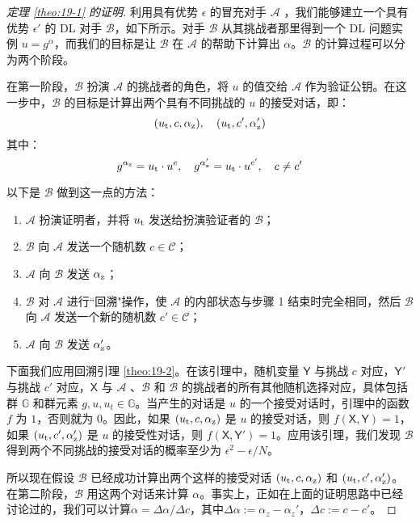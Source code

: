 \begin{proof}[定理 \ref{theo:19-1} 的证明]
	利用具有优势 $\epsilon$ 的冒充对手 $\mathcal{A}$ ，我们能够建立一个具有优势 $\epsilon'$ 的 DL 对手 $\mathcal{B}$，如下所示。对手 $\mathcal{B}$ 从其挑战者那里得到一个 DL 问题实例 $u = g^\alpha$，而我们的目标是让 $\mathcal{B}$ 在 $\mathcal{A}$ 的帮助下计算出 $\alpha$。$\mathcal{B}$ 的计算过程可以分为两个阶段。

在第一阶段，$\mathcal{B}$ 扮演 $\mathcal{A}$ 的挑战者的角色，将 $u$ 的值交给 $\mathcal{A}$ 作为验证公钥。在这一步中，$\mathcal{B}$ 的目标是计算出两个具有不同挑战的 $u$ 的接受对话，即：
\[
(u_{\rm t},c,\alpha_{\rm z}),
\quad
(u_{\rm t},c',\alpha_{\rm z}')
\]
其中：
\[
g^{\alpha_{\rm z}}=u_{\rm t}\cdot u^c,
\quad
g^{\alpha_{\rm z}'}=u_{\rm t}\cdot u^{c'},
\quad
c\neq c'
\]

以下是 $\mathcal{B}$ 做到这一点的方法：
\begin{enumerate}
	\item $\mathcal{A}$ 扮演证明者，并将 $u_{\rm t}$ 发送给扮演验证者的 $\mathcal{B}$；
	\item $\mathcal{B}$ 向 $\mathcal{A}$ 发送一个随机数 $c\in\mathcal{C}$；
	\item $\mathcal{A}$ 向 $\mathcal{B}$ 发送 $\alpha_{\rm z}$；
	\item $\mathcal{B}$ 对 $\mathcal{A}$ 进行``回溯"操作，使 $\mathcal{A}$ 的内部状态与步骤 1 结束时完全相同，然后 $\mathcal{B}$ 向 $\mathcal{A}$ 发送一个新的随机数 $c'\in\mathcal{C}$；
	\item $\mathcal{A}$ 向 $\mathcal{B}$ 发送 $\alpha_{\rm z}'$。
\end{enumerate}
下面我们应用回溯引理 \ref{theo:19-2}。在该引理中，随机变量 $\mathsf{Y}$ 与挑战 $c$ 对应，$\mathsf{Y}'$ 与挑战 $c'$ 对应，$\mathsf{X}$ 与 $\mathcal{A}$ 、$\mathcal{B}$ 和 $\mathcal{B}$ 的挑战者的所有其他随机选择对应，具体包括群 $\mathbb{G}$ 和群元素 $g,u,u_t\in\mathbb{G}$。当产生的对话是 $u$ 的一个接受对话时，引理中的函数 $f$ 为 $1$，否则就为 $0$。因此，如果 $(u_{\rm t},c,\alpha_{\rm z})$ 是 $u$ 的接受对话，则 $f(\mathsf{X},\mathsf{Y})=1$，如果 $(u_{\rm t},c',\alpha_{\rm z}')$ 是 $u$ 的接受性对话，则 $f(\mathsf{X},\mathsf{Y}')=1$。应用该引理，我们发现 $\mathcal{B}$ 得到两个不同挑战的接受对话的概率至少为 $\epsilon^2-{\epsilon}/{N}$。

所以现在假设 $\mathcal{B}$ 已经成功计算出两个这样的接受对话 $(u_{\rm t},c,\alpha_{\rm z})$ 和 $(u_{\rm t},c',\alpha_{\rm z}')$。在第二阶段，$\mathcal{B}$ 用这两个对话来计算 $\alpha$。事实上，正如在上面的证明思路中已经讨论过的，我们可以计算$\alpha={\Delta\alpha}/{\Delta c}$，其中$\Delta\alpha:=\alpha_z-\alpha_z'$，$\Delta c:=c-c'$。


\end{proof}
